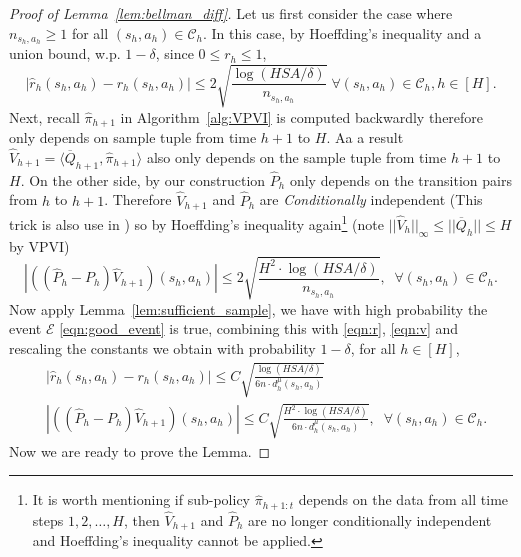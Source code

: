 \begin{proof}[Proof of Lemma~\ref{lem:bellman_diff}]
	Let us first consider the case where $n_{s_h,a_h}\geq 1$ for all $(s_h,a_h)\in\mathcal{C}_h$. In this case, by Hoeffding's inequality and a union bound, w.p. $1-\delta$, since $0\leq r_h\leq 1$,
	\begin{equation}\label{eqn:r}
	|\widehat{r}_h(s_h,a_h)-r_h(s_h,a_h)|\leq 2\sqrt{\frac{\log(HSA/\delta)}{n_{s_h,a_h}}} \;\forall (s_h,a_h)\in\mathcal{C}_h, h\in[H].
	\end{equation}
	Next, recall $\widehat{\pi}_{h+1}$ in Algorithm~\ref{alg:VPVI} is computed backwardly therefore only depends on sample tuple from time $h+1$ to $H$. Aa a result $\widehat{V}_{h+1}=\langle \overline{Q}_{h+1}, \widehat{\pi}_{h+1} \rangle$ also only depends on the sample tuple from time $h+1$ to $H$. On the other side, by our construction $\widehat{P}_h$ only depends on the transition pairs from $h$ to $h+1$. Therefore $\widehat{V}_{h+1}$ and $\widehat{P}_h$ are \emph{Conditionally} independent (This trick is also use in \cite{yin2021near}) so by Hoeffding's inequality again\footnote{It is worth mentioning if sub-policy $\widehat{\pi}_{h+1:t}$ depends on the data from all time steps $1,2,\ldots,H$, then $\widehat{V}_{h+1}$ and $\widehat{P}_h$ are no longer conditionally independent and Hoeffding's inequality cannot be applied. } (note $||\widehat{V}_h||_\infty\leq ||\overline{Q}_h||\leq H$ by VPVI)
	\begin{equation}\label{eqn:v}
	\left|\left((\widehat{P}_h-P_h)\widehat{V}_{h+1}\right)(s_h,a_h)\right|\leq 2\sqrt{\frac{H^2\cdot\log(HSA/\delta)}{n_{s_h,a_h}}}, \;\;\forall (s_h,a_h)\in\mathcal{C}_h.
	\end{equation}
	Now apply Lemma~\ref{lem:sufficient_sample}, we have with high probability the event $\mathcal{E}$ \eqref{eqn:good_event} is true, combining this with \eqref{eqn:r}, \eqref{eqn:v} and rescaling the constants we obtain with probability $1-\delta$, for all $h\in[H]$,
	\begin{equation}\label{eqn:r_v}
	\begin{aligned}
	&|\widehat{r}_h(s_h,a_h)-r_h(s_h,a_h)|\leq C\sqrt{\frac{\log(HSA/\delta)}{6n \cdot d^\mu_h{(s_h,a_h)}}} \\
	&\left|\left((\widehat{P}_h-P_h)\widehat{V}_{h+1}\right)(s_h,a_h)\right|\leq C\sqrt{\frac{H^2\cdot\log(HSA/\delta)}{6n \cdot d^\mu_h{(s_h,a_h)}}}, \;\;\forall (s_h,a_h)\in\mathcal{C}_h.
	\end{aligned}
	\end{equation}
	Now we are ready to prove the Lemma.
	

\end{proof}

